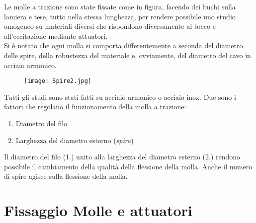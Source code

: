 Le molle a trazione sono state fissate come in figura, facendo dei buchi sulla lamiera e tese, tutto nella stessa lunghezza, per rendere possibile uno studio omogeneo su materiali diversi che rispondono diversamente al tocco e all'eccitazione mediante attuatori.\\
Si è notato che ogni molla si comporta differentemente a seconda del diametro delle spire, della robustezza del materiale e, ovviamente, del diametro del cavo in acciaio armonico.
\begin{figure}[htbp]
        \centering
        \texttt{[image: Spire2.jpg]}
\end{figure}
Tutti gli studi sono stati fatti su acciaio armonico o acciaio inox. Due sono i fattori che regolano il funzionamento della molla a trazione:
\begin{enumerate}
\item{Diametro del filo}
\item{Larghezza del diametro esterno (\textit{spira})}
\end{enumerate}
Il diametro del filo (1.) unito alla larghezza del diametro esterno (2.) rendono possibile il cambiamento della qualità della flessione della molla. Anche il numero di spire agisce sulla flessione della molla.

\section{Fissaggio Molle e attuatori}

